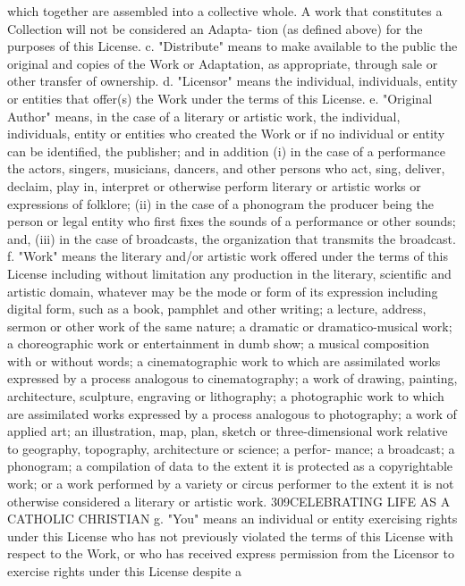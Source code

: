 \documentclass[oneside]{book}
\begin{document}
which together are assembled into a collective whole. A work that constitutes a
Collection will not be considered an Adapta- tion (as defined above) for the
purposes of this License.  c. "Distribute" means to make available to the public
the original and copies of the Work or Adaptation, as appropriate, through sale
or other transfer of ownership.  d. "Licensor" means the individual,
individuals, entity or entities that offer(s) the Work under the terms of this
License.  e. "Original Author" means, in the case of a literary or artistic
work, the individual, individuals, entity or entities who created the Work or if
no individual or entity can be identified, the publisher; and in addition (i) in
the case of a performance the actors, singers, musicians, dancers, and other
persons who act, sing, deliver, declaim, play in, interpret or otherwise perform
literary or artistic works or expressions of folklore; (ii) in the case of a
phonogram the producer being the person or legal entity who first fixes the
sounds of a performance or other sounds; and, (iii) in the case of broadcasts,
the organization that transmits the broadcast.  f. "Work" means the literary
and/or artistic work offered under the terms of this License including without
limitation any production in the literary, scientific and artistic domain,
whatever may be the mode or form of its expression including digital form, such
as a book, pamphlet and other writing; a lecture, address, sermon or other work
of the same nature; a dramatic or dramatico-musical work; a choreographic work
or entertainment in dumb show; a musical composition with or without words; a
cinematographic work to which are assimilated works expressed by a process
analogous to cinematography; a work of drawing, painting, architecture,
sculpture, engraving or lithography; a photographic work to which are
assimilated works expressed by a process analogous to photography; a work of
applied art; an illustration, map, plan, sketch or three-dimensional work
relative to geography, topography, architecture or science; a perfor- mance; a
broadcast; a phonogram; a compilation of data to the extent it is protected as a
copyrightable work; or a work performed by a variety or circus performer to the
extent it is not otherwise considered a literary or artistic work.
309CELEBRATING LIFE AS A CATHOLIC CHRISTIAN g. "You" means an individual or
entity exercising rights under this License who has not previously violated the
terms of this License with respect to the Work, or who has received express
permission from the Licensor to exercise rights under this License despite a
\end{document}
